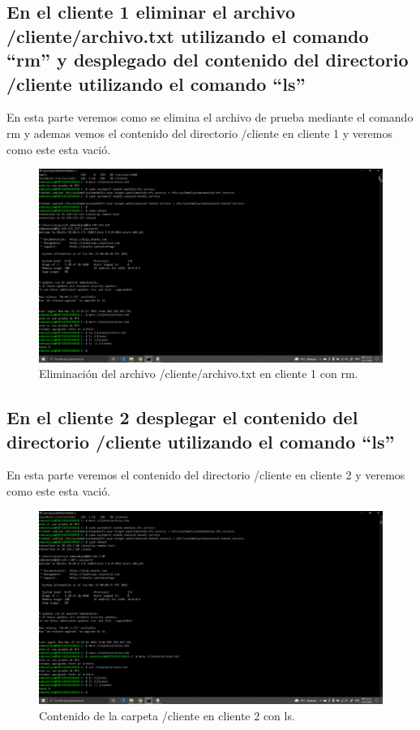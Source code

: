 \documentclass[11pt]{article}
\begin{document}
		\subsection{En el cliente 1 eliminar el archivo /cliente/archivo.txt utilizando el comando ``rm'' y desplegado del contenido del directorio /cliente utilizando el comando ``ls''}
		En esta parte veremos como se elimina el archivo de prueba mediante el comando rm y ademas vemos el contenido del directorio /cliente en cliente 1 y veremos como este esta vació.
		\begin{figure}[H]
			\centering
			\includegraphics[scale=0.34]{resources/p14y15.png}
			\caption{Eliminación del archivo /cliente/archivo.txt en cliente 1 con rm.}\label{fig:picture}
		\end{figure}
		\subsection{En el cliente 2 desplegar el contenido del directorio /cliente utilizando el comando ``ls''}
		En esta parte veremos el contenido del directorio /cliente en cliente 2 y veremos como este esta vació.
		\begin{figure}[H]
			\centering
			\includegraphics[scale=0.34]{resources/p16.png}
			\caption{Contenido de la carpeta /cliente en cliente 2 con ls.}\label{fig:picture}
		\end{figure}
\end{document}
